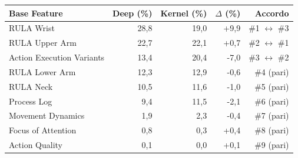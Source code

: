 \begin{tabular*}{\linewidth}{@{}l@{\extracolsep{\fill}}rrrr@{}}
\toprule
\textbf{Base Feature} & \textbf{Deep (\%)} & \textbf{Kernel (\%)} & \textbf{$\Delta$ (\%)} & \textbf{Accordo} \\
\midrule
RULA Wrist & 28{,}8 & 19{,}0 & +9{,}9 & \#1 $\leftrightarrow$ \#3 \\
RULA Upper Arm & 22{,}7 & 22{,}1 & +0{,}7 & \#2 $\leftrightarrow$ \#1 \\
Action Execution Variants & 13{,}4 & 20{,}4 & -7{,}0 & \#3 $\leftrightarrow$ \#2 \\
RULA Lower Arm & 12{,}3 & 12{,}9 & -0{,}6 & \#4 (pari) \\
RULA Neck & 10{,}5 & 11{,}6 & -1{,}0 & \#5 (pari) \\
Process Log & 9{,}4 & 11{,}5 & -2{,}1 & \#6 (pari) \\
Movement Dynamics & 1{,}9 & 2{,}3 & -0{,}4 & \#7 (pari) \\
Focus of Attention & 0{,}8 & 0{,}3 & +0{,}4 & \#8 (pari) \\
Action Quality & 0{,}1 & 0{,}0 & +0{,}1 & \#9 (pari) \\
\bottomrule
\end{tabular*}

